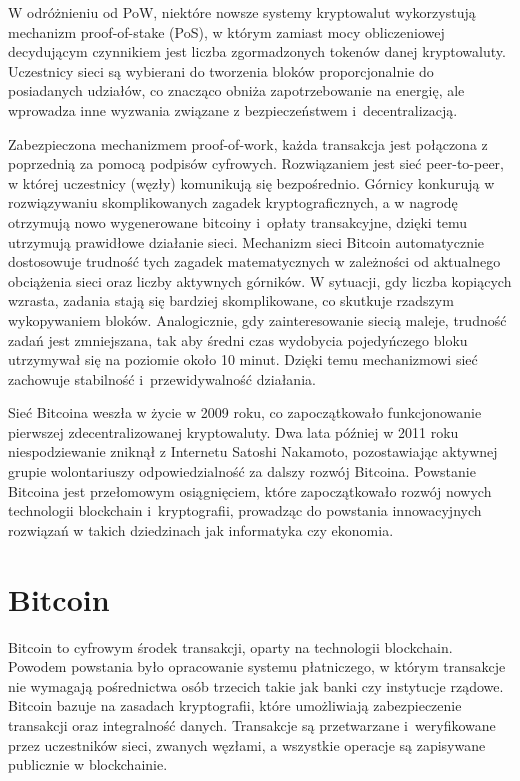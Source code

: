 \documentclass[12pt,a4paper]{report}
\theoremstyle{definition} %
\begin{document}
W odróżnieniu od PoW, niektóre nowsze systemy kryptowalut wykorzystują mechanizm proof-of-stake (PoS), w którym zamiast mocy obliczeniowej decydującym czynnikiem jest liczba zgormadzonych tokenów danej kryptowaluty. Uczestnicy sieci są wybierani do tworzenia bloków proporcjonalnie do posiadanych udziałów, co znacząco obniża zapotrzebowanie na energię, ale wprowadza inne wyzwania związane z bezpieczeństwem i~decentralizacją.

Zabezpieczona mechanizmem proof-of-work, każda transakcja jest połączona z poprzednią za pomocą podpisów cyfrowych. Rozwiązaniem jest sieć peer-to-peer, w której uczestnicy (węzły) komunikują się bezpośrednio. Górnicy konkurują w rozwiązywaniu skomplikowanych zagadek kryptograficznych, a w nagrodę otrzymują  nowo wygenerowane bitcoiny i~opłaty transakcyjne, dzięki temu utrzymują prawidłowe działanie sieci. Mechanizm sieci Bitcoin automatycznie dostosowuje trudność tych zagadek matematycznych w zależności od aktualnego obciążenia sieci oraz liczby aktywnych górników. W sytuacji, gdy liczba kopiących wzrasta, zadania stają się bardziej skomplikowane, co skutkuje rzadszym wykopywaniem bloków. Analogicznie, gdy zainteresowanie siecią maleje, trudność zadań jest zmniejszana, tak aby średni czas wydobycia pojedyńczego bloku utrzymywał się na poziomie około 10 minut. Dzięki temu mechanizmowi sieć zachowuje stabilność i~przewidywalność działania.

	Sieć Bitcoina weszła w życie w 2009 roku, co zapoczątkowało funkcjonowanie pierwszej zdecentralizowanej kryptowaluty. Dwa lata później w 2011 roku niespodziewanie zniknął z Internetu Satoshi Nakamoto, pozostawiając aktywnej grupie wolontariuszy odpowiedzialność za dalszy rozwój Bitcoina. Powstanie Bitcoina jest przełomowym osiągnięciem, 			które zapoczątkowało rozwój nowych technologii blockchain i~kryptografii, prowadząc do powstania innowacyjnych rozwiązań w takich dziedzinach jak informatyka czy ekonomia. 
	\section{Bitcoin}
	\hspace*{\parindent} Bitcoin to cyfrowym środek transakcji, oparty na technologii blockchain. Powodem powstania było opracowanie systemu płatniczego, w którym transakcje nie wymagają pośrednictwa osób trzecich takie jak banki czy instytucje rządowe. Bitcoin bazuje na zasadach kryptografii, które umożliwiają zabezpieczenie transakcji oraz 		integralność danych. Transakcje są przetwarzane i~weryfikowane przez uczestników sieci, zwanych węzłami, a wszystkie operacje są zapisywane publicznie w blockchainie.
\end{document}

